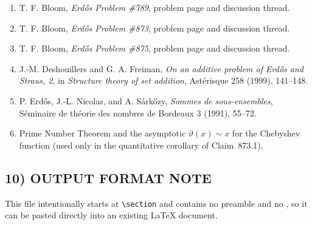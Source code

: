 \begin{enumerate}
\item T. F. Bloom, \emph{Erd\H{o}s Problem \#789}, problem page and discussion thread.
\item T. F. Bloom, \emph{Erd\H{o}s Problem \#873}, problem page and discussion thread.
\item T. F. Bloom, \emph{Erd\H{o}s Problem \#875}, problem page and discussion thread.
\item J.-M. Deshouillers and G. A. Freiman, \emph{On an additive problem of Erd\H{o}s and Straus, 2}, in \emph{Structure theory of set addition}, Ast\'erisque 258 (1999), 141--148.
\item P. Erd\H{o}s, J.-L. Nicolas, and A. S\'ark\H{o}zy, \emph{Sommes de sous-ensembles}, S\'eminaire de th\'eorie des nombres de Bordeaux 3 (1991), 55--72.
\item Prime Number Theorem and the asymptotic \(\vartheta(x)\sim x\) for the Chebyshev function (used only in the quantitative corollary of Claim~873.1).
\end{enumerate}

\subsection*{10) OUTPUT FORMAT NOTE}

This file intentionally starts at \verb|\section| and contains no preamble and no \verb||, so it can be pasted directly into an existing LaTeX document.
